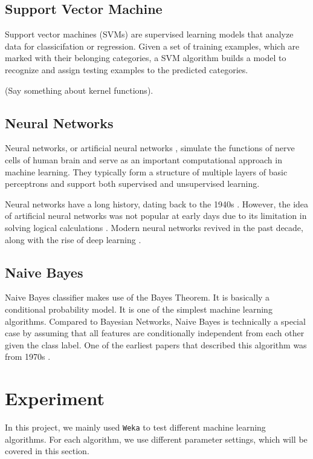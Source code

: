 \documentclass[11pt]{article}
\begin{document}
\subsection{Support Vector Machine}
Support vector machines (SVMs) \cite{cortes1995support} are supervised learning models that analyze data for classicifation or regression. Given a set of training examples, which are marked with their belonging categories, a SVM algorithm builds a model to recognize and assign testing examples to the predicted categories. 

(Say something about kernel functions).

\subsection{Neural Networks}
Neural networks, or artificial neural networks \cite{hagan1996neural}, simulate the functions of nerve cells of human brain and serve as an important computational approach in machine learning. They typically form a structure of multiple layers of basic perceptrons and support both supervised and unsupervised learning.

Neural networks have a long history, dating back to the 1940s \cite{mcculloch1943logical}. However, the idea of artificial neural networks was not popular at early days due to its limitation in solving logical calculations \cite{minsky1988perceptrons}. Modern neural networks revived in the past decade, along with the rise of deep learning \cite{bengio2009learning, schmidhuber2015deep}.

\subsection{Naive Bayes}
Naive Bayes classifier makes use of the Bayes Theorem. It is basically a conditional probability model. It is one of the simplest machine learning algorithms. Compared to Bayesian Networks, Naive Bayes is technically a special case by assuming that all features are conditionally independent from each other given the class label. One of the earliest papers that described this algorithm was from 1970s \cite{duda1973pattern}. 

\section{Experiment}\label{exp}
In this project, we mainly used \texttt{Weka} \cite{hall2009weka} to test different machine learning algorithms. For each algorithm, we use different parameter settings, which will be covered in this section.
\end{document}
